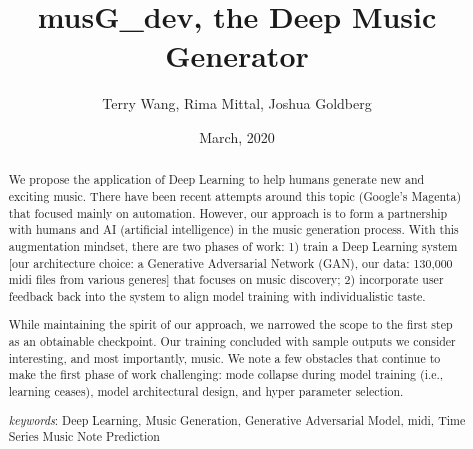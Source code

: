 \documentclass[12pt,oneside]{chicagocapstone}
\title{musG\_dev, the Deep Music Generator}
\author{Terry Wang, Rima Mittal, Joshua Goldberg}
\date{March, 2020} %
\begin{document}
  \maketitle

\frontmatter %
\pagestyle{empty} %


  \begin{abstract}
    We propose the application of Deep Learning to help humans generate new and exciting music. There have been recent attempts around this topic (Google's Magenta) that focused mainly on automation. However, our approach is to form a partnership with humans and AI (artificial intelligence) in the music generation process. With this augmentation mindset, there are two phases of work: 1) train a Deep Learning system {[}our architecture choice: a Generative Adversarial Network (GAN), our data: 130,000 midi files from various generes{]} that focuses on music discovery; 2) incorporate user feedback back into the system to align model training with individualistic taste.
    
    While maintaining the spirit of our approach, we narrowed the scope to the first step as an obtainable checkpoint. Our training concluded with sample outputs we consider interesting, and most importantly, music. We note a few obstacles that continue to make the first phase of work challenging: mode collapse during model training (i.e., learning ceases), model architectural design, and hyper parameter selection.
    
    \bigskip 
    \bigskip
    \bigskip
    
    \emph{keywords}: Deep Learning, Music Generation, Generative Adversarial Model, midi, Time Series Music Note Prediction
    
    \bigskip 
    \bigskip
    \bigskip
  \end{abstract}
\end{document}
